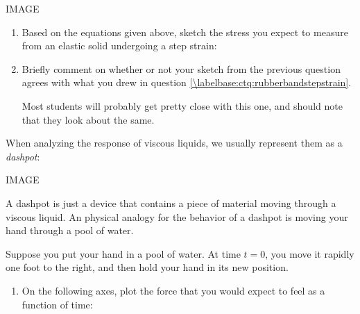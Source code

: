 \begin{activity}
\begin{ctqs}
		IMAGE
	
		\begin{enumerate}
			\item Based on the equations given above, sketch the stress you expect to measure from an elastic solid undergoing a step strain:
			
				\begin{solution}[1.5in]
				\end{solution}
				
			\item Briefly comment on whether or not your sketch from the previous question agrees with what you drew in question \ref{\labelbase:ctq:rubberbandstepstrain}.
			
				\begin{solution}[1in]
					Most students will probably get pretty close with this one, and should note that they look about the same.
				\end{solution}
		\end{enumerate}
\end{ctqs}

\begin{model}

	When analyzing the response of viscous liquids, we usually represent them as a \emph{dashpot}:
	
	IMAGE
	
	A dashpot is just a device that contains a piece of material moving through a viscous liquid. An physical analogy for the behavior of a dashpot is moving your hand through a pool of water.
	
\end{model}

\begin{ctqs}
	
	\question  Suppose you put your hand in a pool of water. At time $t=0$, you move it rapidly one foot to the right, and then hold your hand in its new position.\label{\labelbase:ctq:poolstepstrain}
	
		\begin{enumerate}
			\item On the following axes, plot the force that you would expect to feel as a function of time:
			
				\begin{solution}[1.5in]
				\end{solution}
			

\end{enumerate}
\end{ctqs}
\end{activity}
